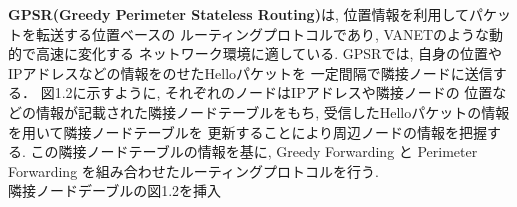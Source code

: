 \textbf{GPSR(Greedy Perimeter Stateless Routing)}\cite{gpsr}は, 
位置情報を利用してパケットを転送する位置ベースの
ルーティングプロトコルであり, VANETのような動的で高速に変化する
ネットワーク環境に適している.
GPSRでは, 自身の位置やIPアドレスなどの情報をのせたHelloパケットを
一定間隔で隣接ノードに送信する．
図1.2に示すように, それぞれのノードはIPアドレスや隣接ノードの
位置などの情報が記載された隣接ノードテーブルをもち, 
受信したHelloパケットの情報を用いて隣接ノードテーブルを
更新することにより周辺ノードの情報を把握する. 
この隣接ノードテーブルの情報を基に, Greedy Forwarding と 
Perimeter Forwarding を組み合わせたルーティングプロトコルを行う.\\

{\Huge 隣接ノードデーブルの図1.2を挿入}\\

\\

\\
